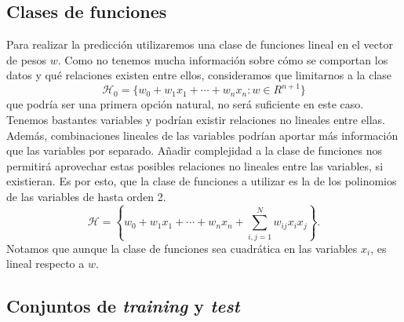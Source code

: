 \documentclass[a4paper, 20pt]{article}
\begin{document}

\subsection{Clases de funciones}
Para realizar la predicción utilizaremos una clase de funciones lineal en el vector de pesos $w$. Como no tenemos mucha información sobre cómo se comportan los datos y qué relaciones existen entre ellos, consideramos que limitarnos a la clase \[
\mathcal{H}_0 = \{w_0 + w_1x_1 +\cdots + w_nx_n : w \in R^{n+1}\}
\]
que podría ser una primera opción natural, no será suficiente en este caso. Tenemos bastantes variables y podrían existir relaciones no lineales entre ellas. Además, combinaciones lineales de las variables podrían aportar más información que las variables por separado. Añadir complejidad a la clase de funciones nos permitirá aprovechar estas posibles relaciones no lineales entre las variables, si existieran. Es por esto, que la clase de funciones a utilizar es la de los polinomios de las variables de hasta orden 2.
 \[
\mathcal{H} = \left \{w_0 + w_1x_1 +\cdots + w_nx_n + \sum_{i,j = 1}^Nw_{ij} x_ix_j\right\}.
\]
Notamos que aunque la clase de funciones sea cuadrática en las variables $x_i$, es lineal respecto a $w$.


\subsection{Conjuntos de \textit{training} y \textit{test}}
\end{document}
